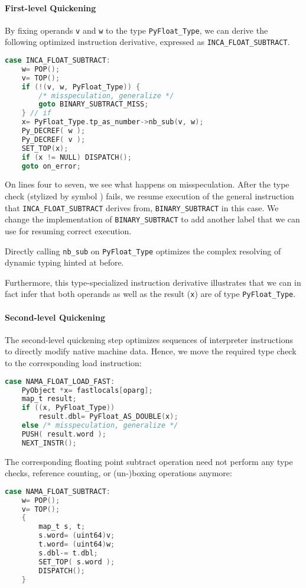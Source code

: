 \documentclass[preprint,10pt]{popl14conf}
\newcommand{\pyType}[1]{\texttt{Py#1\_Type}}
\begin{document}
\paragraph{First-level Quickening}

By fixing operands \texttt{v} and \texttt{w} to the type \pyType{Float}, we can derive the following
optimized instruction derivative, expressed as \texttt{INCA_FLOAT_SUBTRACT}.
\begin{lstlisting}[language=C,mathescape=true,style=othercode]
case INCA_FLOAT_SUBTRACT:
    w= POP();
    v= TOP();
    if (!(v, w, PyFloat_Type)) {
        /* misspeculation, generalize */
        goto BINARY_SUBTRACT_MISS;
    } // if
    x= PyFloat_Type.tp_as_number->nb_sub(v, w);
    Py_DECREF( w );
    Py_DECREF( v );
    SET_TOP(x);
    if (x != NULL) DISPATCH();
    goto on_error;
\end{lstlisting}
On lines four to seven, we see what happens on misspeculation.
After the type check (stylized by symbol ) fails, we resume execution
of the general instruction that \texttt{INCA_FLOAT_SUBTRACT} derives from, \texttt{BINARY_SUBTRACT}
in this case.
We change the implementation of \texttt{BINARY_SUBTRACT} to add another label that we can use for
resuming correct execution.

Directly calling \texttt{nb_sub} on \pyType{Float} optimizes the complex resolving of dynamic typing
hinted at before.

Furthermore, this type-specialized instruction derivative illustrates that we can in fact infer that
both operands as well as the result (\texttt{x}) are of type \pyType{Float}.

\paragraph{Second-level Quickening}

The second-level quickening step optimizes sequences of interpreter instructions to directly modify
native machine data.
Hence, we move the required type check to the corresponding load instruction:
\begin{lstlisting}[mathescape=true,language=C,morekeywords={uint64,int64,TARGET,PUSH,NEXT_INSTR,T},style=othercode]
case NAMA_FLOAT_LOAD_FAST:
    PyObject *x= fastlocals[oparg];
    map_t result;
    if ((x, PyFloat_Type))
        result.dbl= PyFloat_AS_DOUBLE(x);
    else /* misspeculation, generalize */
    PUSH( result.word );
    NEXT_INSTR();
\end{lstlisting}
The corresponding floating point subtract operation need not perform any type checks, reference
counting, or (un-)boxing operations anymore:
\begin{lstlisting}[language=C,mathescape=true,style=othercode,morekeywords={uint64,map_t}]
case NAMA_FLOAT_SUBTRACT:
    w= POP();
    v= TOP();
    {
        map_t s, t;
        s.word= (uint64)v;
        t.word= (uint64)w;
        s.dbl-= t.dbl;
        SET_TOP( s.word );
        DISPATCH();
    }
\end{lstlisting}
\end{document}
